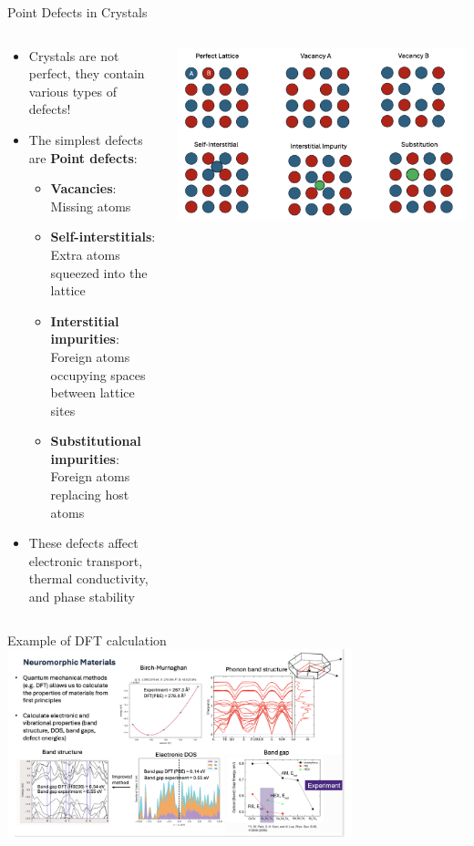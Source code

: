 \documentclass[aspectratio=169]{beamer}
\begin{document}
\begin{frame}{Point Defects in Crystals}
  \begin{columns}
    \begin{column}{0.65\textwidth}
      \small
      \begin{itemize}
        \item Crystals are not perfect, they contain various types of defects! 
        \item The simplest defects are {\bf Point defects}:
        \begin{itemize}
          \item \textbf{Vacancies}: Missing atoms 
          \item \textbf{Self-interstitials}: Extra atoms squeezed into the lattice
          \item \textbf{Interstitial impurities}: Foreign atoms occupying spaces between lattice sites
          \item \textbf{Substitutional impurities}: Foreign atoms replacing host atoms
        \end{itemize}
        \item These defects affect electronic transport, thermal conductivity, and phase stability
      \end{itemize}
    \end{column}
    \begin{column}{0.40\textwidth}
      \centering
      \vfill
      \includegraphics[width=\textwidth]{media/point_defects.png}
      \vfill
    \end{column}
  \end{columns}
\end{frame}


\begin{frame}{Example of DFT calculation}
  \centering
  \includegraphics[width=0.75\textwidth]{media/GST_DFT.png}
\end{frame}
\end{document}
